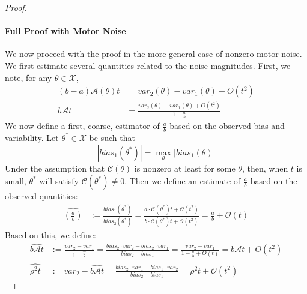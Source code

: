\begin{proof}
\paragraph*{Full Proof with Motor Noise}
    We now proceed with the proof in the more general case of nonzero motor noise.
    We first estimate several quantities related to the noise magnitudes.
    First, we note, for any $\theta \in \mathcal{X}$,
    \begin{align*}
        (b-a)\mathcal{A}(\theta)t &= var_2(\theta) - var_1(\theta) + O(t^2)\\
        b\mathcal{A}t &= \frac{var_2(\theta) - var_1(\theta) + O(t^2)}{1 -  \frac{a}{b}}
        \end{align*}
        We now define a first, coarse, estimator of $\frac{a}{b}$ based on the observed bias and variability.
        Let $\theta^* \in \mathcal{X}$ be such that
        \begin{equation}
            |bias_1(\theta^*)| = \max_\theta |bias_1(\theta)|
        \end{equation}
        Under the assumption that $\mathcal{C}(\theta)$ is nonzero at least for some $\theta$, then, when $t$ is small, $\theta^*$ will satisfy $\mathcal{C}(\theta^*) \neq 0$.
        Then we define an estimate of $\frac{a}{b}$ based on the observed quantities:
        \begin{align*}
        \widehat{(\frac{a}{b})} &:= \frac{bias_1(\theta^*)}{bias_2(\theta^*)} = \frac{a\cdot \mathcal{C}(\theta^*)t + \mathcal{O}(t^2)}{b\cdot \mathcal{C}(\theta^*)t + \mathcal{O}(t^2)} = \frac{a}{b} + \mathcal{O}(t)
        \end{align*}
        Based on this, we define: 
        \begin{align*}
        \widehat{b\mathcal{A}t} &:= \frac{var_2 - var_1}{1 - \hat{\frac{a}{b}}} = \frac{bias_2 \cdot var_2 - bias_2 \cdot var_1}{bias_2 - bias_1}=\frac{var_2 - var_1}{1 - \frac{a}{b} + O(t)} = b\mathcal{A}t + O(t^2)\\
                \widehat{\rho^2t} &:= var_2 - \widehat{b\mathcal{A}t} = \frac{bias_2 \cdot var_1 - bias_1 \cdot var_2}{bias_2 - bias_1}= \rho^2t + \mathcal{O}(t^2) 
    \end{align*}

\end{proof}
